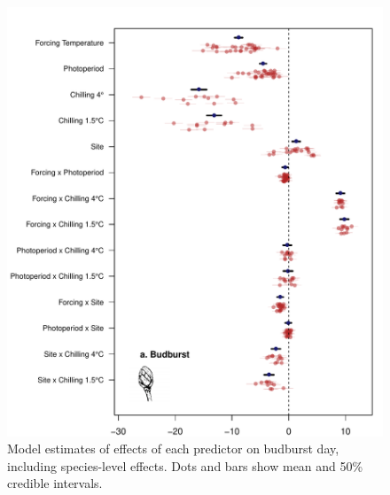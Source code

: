 \documentclass{article}
\begin{document}
\begin{figure}
\includegraphics[width=1\textwidth, page=1]{Fig1_bb_lo+sp} %
\caption{Model estimates of effects of each predictor on budburst day, including species-level effects. Dots and bars show mean and 50\% credible intervals.}
\label{fig:figS2}
\end{figure}

\clearpage
\end{document}
